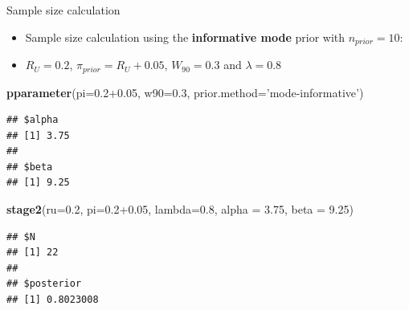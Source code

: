 \documentclass{beamer}
\newenvironment{Shaded}{}{}
\newcommand{\KeywordTok}[1]{\textcolor[rgb]{0.00,0.44,0.13}{\textbf{{#1}}}}
\newcommand{\DataTypeTok}[1]{\textcolor[rgb]{0.56,0.13,0.00}{{#1}}}
\newcommand{\FloatTok}[1]{\textcolor[rgb]{0.25,0.63,0.44}{{#1}}}
\newcommand{\StringTok}[1]{\textcolor[rgb]{0.25,0.44,0.63}{{#1}}}
\newcommand{\NormalTok}[1]{{#1}}
\begin{document}
\begin{frame}[fragile]{Sample size calculation}

\begin{itemize}
\item
  Sample size calculation using the \textbf{informative mode} prior with
  \(n_{prior}=10\):
\item
  \(R_U=0.2\), \(\pi_{prior}=R_U+0.05\), \(W_{90}=0.3\) and
  \(\lambda=0.8\)
\end{itemize}

\begin{Shaded}
\begin{Highlighting}[]
\KeywordTok{pparameter}\NormalTok{(}\DataTypeTok{pi=}\FloatTok{0.2+0.05}\NormalTok{, }\DataTypeTok{w90=}\FloatTok{0.3}\NormalTok{, }\DataTypeTok{prior.method=}\StringTok{'mode-informative'}\NormalTok{)}
\end{Highlighting}
\end{Shaded}

\begin{verbatim}
## $alpha
## [1] 3.75
## 
## $beta
## [1] 9.25
\end{verbatim}

\begin{Shaded}
\begin{Highlighting}[]
\KeywordTok{stage2}\NormalTok{(}\DataTypeTok{ru=}\FloatTok{0.2}\NormalTok{, }\DataTypeTok{pi=}\FloatTok{0.2+0.05}\NormalTok{, }\DataTypeTok{lambda=}\FloatTok{0.8}\NormalTok{, }\DataTypeTok{alpha =} \FloatTok{3.75}\NormalTok{, }\DataTypeTok{beta =} \FloatTok{9.25}\NormalTok{)}
\end{Highlighting}
\end{Shaded}

\begin{verbatim}
## $N
## [1] 22
## 
## $posterior
## [1] 0.8023008
\end{verbatim}

\end{frame}
\end{document}
